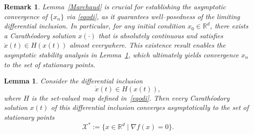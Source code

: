\documentclass{article}
\newtheorem{lemma}[theorem]{Lemma}
\newtheorem{remark}[theorem]{Remark}
\begin{document}
\begin{remark}
Lemma~\ref{Marchaud} is crucial for establishing the asymptotic convergence of
\(\{x_n\}\) via \eqref{eqodi}, as it guarantees well--posedness of the limiting
differential inclusion. In particular, for any initial condition
\(x_0\in\mathbb{R}^d\), there exists a Carath\'eodory solution \(x(\cdot)\) that is
absolutely continuous and satisfies \(\dot{x}(t)\in H(x(t))\) almost everywhere.
This existence result enables the asymptotic stability analysis in
Lemma~\ref{ref:odistability}, which ultimately yields convergence $x_n$ to the set of stationary points.
\end{remark}

\begin{lemma}
\label{ref:odistability}
Consider the differential inclusion
\[
    \dot{x}(t) \in H(x(t)),
\]
where $H$ is the set-valued map defined in~\eqref{eqodi}. Then every
Carath\'eodory solution $x(t)$ of this differential inclusion converges
asymptotically to the set of stationary points
\[
    \mathcal{X}^\ast
    :=
    \{ x \in \mathbb{R}^d \mid \nabla f(x) = 0 \}.
\]
\end{lemma}
\end{document}
